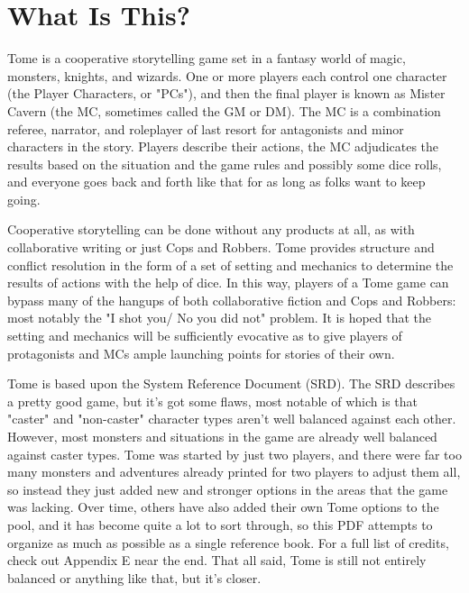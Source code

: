\section{What Is This?}

Tome is a cooperative storytelling game set in a fantasy world of magic, monsters, knights, and wizards. One or more players each control one character (the Player Characters, or "PCs"), and then the final player is known as Mister Cavern (the MC, sometimes called the GM or DM). The MC is a combination referee, narrator, and roleplayer of last resort for antagonists and minor characters in the story. Players describe their actions, the MC adjudicates the results based on the situation and the game rules and possibly some dice rolls, and everyone goes back and forth like that for as long as folks want to keep going.

Cooperative storytelling can be done without any products at all, as with collaborative writing or just Cops and Robbers. Tome provides structure and conflict resolution in the form of a set of setting and mechanics to determine the results of actions with the help of dice. In this way, players of a Tome game can bypass many of the hangups of both collaborative fiction and Cops and Robbers: most notably the "I shot you/ No you did not" problem. It is hoped that the setting and mechanics will be sufficiently evocative as to give players of protagonists and MCs ample launching points for stories of their own.

Tome is based upon the System Reference Document (SRD). The SRD describes a pretty good game, but it's got some flaws, most notable of which is that "caster" and "non-caster" character types aren't well balanced against each other. However, most monsters and situations in the game are already well balanced against caster types. Tome was started by just two players, and there were far too many monsters and adventures already printed for two players to adjust them all, so instead they just added new and stronger options in the areas that the game was lacking. Over time, others have also added their own Tome options to the pool, and it has become quite a lot to sort through, so this PDF attempts to organize as much as possible as a single reference book. For a full list of credits, check out Appendix E near the end. That all said, Tome is still not entirely balanced or anything like that, but it's closer.

